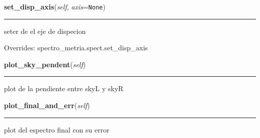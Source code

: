 \hspace{.8\funcindent}\begin{boxedminipage}{\funcwidth}

    \raggedright \textbf{set\_disp\_axis}(\textit{self}, \textit{axis}={\tt None})

    \vspace{-1.5ex}

    \rule{\textwidth}{0.5\fboxrule}
\setlength{\parskip}{2ex}
    seter de el eje de dispecion

\setlength{\parskip}{1ex}
      Overrides: spectro\_metria.spect.set\_disp\_axis

    \end{boxedminipage}

    \label{spectro_metria_g:spect:plot_sky_pendent}

    \vspace{0.5ex}

\hspace{.8\funcindent}\begin{boxedminipage}{\funcwidth}

    \raggedright \textbf{plot\_sky\_pendent}(\textit{self})

    \vspace{-1.5ex}

    \rule{\textwidth}{0.5\fboxrule}
\setlength{\parskip}{2ex}
    plot de la pendiente entre skyL y skyR

\setlength{\parskip}{1ex}
    \end{boxedminipage}

    \label{spectro_metria_g:spect:plot_final_and_err}

    \vspace{0.5ex}

\hspace{.8\funcindent}\begin{boxedminipage}{\funcwidth}

    \raggedright \textbf{plot\_final\_and\_err}(\textit{self})

    \vspace{-1.5ex}

    \rule{\textwidth}{0.5\fboxrule}
\setlength{\parskip}{2ex}
    plot del espectro final con su error

\setlength{\parskip}{1ex}
    \end{boxedminipage}

